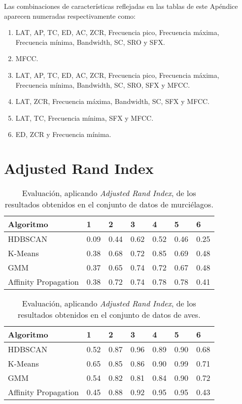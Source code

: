 Las combinaciones de características reflejadas en las tablas de este Apéndice aparecen numeradas respectivamente como:

\begin{enumerate}
    \item LAT, AP, TC, ED, AC, ZCR, Frecuencia pico, Frecuencia máxima, Frecuencia mínima, Bandwidth, SC, SRO y SFX\@. %
    \item MFCC\@. %
    \item LAT, AP, TC, ED, AC, ZCR, Frecuencia pico, Frecuencia máxima, Frecuencia mínima, Bandwidth, SC, SRO, SFX y MFCC\@.
    \item LAT, ZCR, Frecuencia máxima, Bandwidth, SC, SFX y MFCC\@. %
    \item LAT, TC, Frecuencia mínima, SFX y MFCC\@. %
    \item ED, ZCR y Frecuencia mínima.
\end{enumerate}

\section{Adjusted Rand Index}\label{sec:ARI-evaluation}

\begin{table}[H]
    \centering
    \begin{tabular}{lllllll}
        \hline
        Algoritmo & 1 & 2 & 3 & 4 & 5 & 6  \\ \hline
        HDBSCAN & 0.09 & 0.44 & 0.62 & 0.52 & 0.46 & 0.25 \\
        K-Means & 0.38 & 0.68 & 0.72 & \cellcolor[HTML]{FFFC9E}0.85 & 0.69 & 0.48 \\
        GMM & 0.37 & 0.65 & 0.74 & 0.72 & 0.67 & 0.48 \\
        Affinity Propagation & 0.38 & 0.72 & 0.74 & 0.78 & 0.78 & 0.41 \\
    \end{tabular}
    \caption{Evaluación, aplicando \textit{Adjusted Rand Index}, de los resultados obtenidos en el conjunto de datos de murciélagos.}
    \label{table:bats-ari}
\end{table}

\begin{table}[H]
    \centering
    \begin{tabular}{lllllll}
        \hline
        Algoritmo & 1 & 2 & 3 & 4 & 5 & 6  \\ \hline
        HDBSCAN & 0.52 & 0.87 & 0.96 & 0.89 & 0.90 & 0.68 \\
        K-Means & 0.65 & 0.85 & 0.86 & 0.90 & \cellcolor[HTML]{FFFC9E}0.99 & 0.71 \\
        GMM & 0.54 & 0.82 & 0.81 & 0.84 & 0.90 & 0.72 \\
        Affinity Propagation & 0.45 & 0.88 & 0.92 & 0.95 & 0.95 & 0.43 \\
    \end{tabular}
    \caption{Evaluación, aplicando \textit{Adjusted Rand Index}, de los resultados obtenidos en el conjunto de datos de aves.}
    \label{table:birds-ari}
\end{table}

